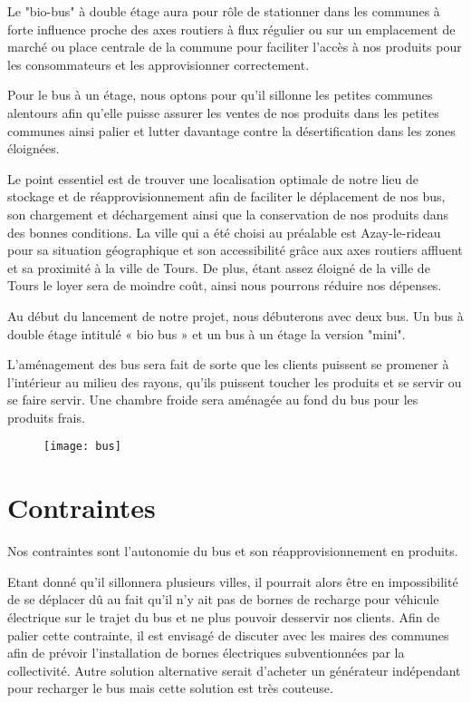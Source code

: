 \documentclass[12pt,a4paper]{report}
\begin{document}
		 	Le "bio-bus" à double étage aura pour rôle de stationner dans les communes à forte influence proche des axes routiers à flux régulier ou sur un emplacement de marché ou place centrale de la commune pour faciliter l’accès à nos produits pour les consommateurs et les approvisionner correctement.
			
			Pour le bus à un étage, nous optons pour qu’il sillonne les petites communes alentours  afin qu’elle puisse assurer les ventes de nos produits dans les petites communes ainsi palier et lutter davantage contre la désertification dans les zones éloignées.
			

			Le point essentiel est de trouver une localisation optimale de notre lieu de stockage et de réapprovisionnement afin de faciliter le déplacement de nos bus, son chargement et déchargement ainsi que la conservation de nos produits dans des bonnes conditions. La ville qui a été choisi au préalable est Azay-le-rideau pour sa situation géographique et son accessibilité grâce aux axes routiers affluent et sa proximité à la ville de Tours. De plus, étant assez éloigné de la ville de Tours le loyer sera de moindre coût, ainsi nous pourrons réduire nos dépenses.
			
						
			Au début du lancement de notre projet, nous débuterons avec deux bus. Un bus à double étage intitulé « bio bus » et un bus à un étage la version "mini".
			
			L’aménagement des bus sera fait de sorte que les clients puissent se promener à l'intérieur au milieu des rayons, qu'ils puissent toucher les produits et se servir ou se faire servir. Une chambre froide sera aménagée au fond du bus pour les produits frais.\\ 
			
			

			
			\begin{figure}[h]
				\centering
				\texttt{[image: bus]}
			\end{figure}					

			



				
			\section{Contraintes}
			
				Nos contraintes sont l’autonomie du bus et son réapprovisionnement en produits. 
				
				Etant donné qu'il sillonnera plusieurs villes, il  pourrait alors être en impossibilité de se déplacer dû au fait qu’il n’y ait pas de bornes de recharge pour véhicule électrique sur le trajet du bus et ne plus pouvoir desservir nos clients. Afin de palier cette contrainte, il est envisagé de discuter avec les maires des communes afin de prévoir l'installation de bornes électriques subventionnées par la collectivité. Autre solution alternative serait d'acheter un générateur indépendant pour recharger le bus mais cette solution est très couteuse.
				
\end{document}
